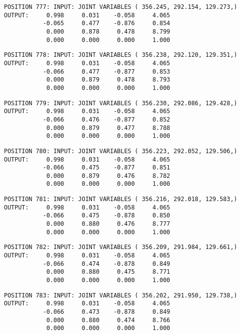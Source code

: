 \begin{verbatim}
POSITION 777: INPUT: JOINT VARIABLES ( 356.245, 292.154, 129.273,)
OUTPUT:     0.998     0.031    -0.058     4.065
           -0.065     0.477    -0.876     0.854
            0.000     0.878     0.478     8.799
            0.000     0.000     0.000     1.000
\end{verbatim} \pagebreak[1]\begin{verbatim}
POSITION 778: INPUT: JOINT VARIABLES ( 356.238, 292.120, 129.351,)
OUTPUT:     0.998     0.031    -0.058     4.065
           -0.066     0.477    -0.877     0.853
            0.000     0.879     0.478     8.793
            0.000     0.000     0.000     1.000
\end{verbatim} \pagebreak[1]\begin{verbatim}
POSITION 779: INPUT: JOINT VARIABLES ( 356.230, 292.086, 129.428,)
OUTPUT:     0.998     0.031    -0.058     4.065
           -0.066     0.476    -0.877     0.852
            0.000     0.879     0.477     8.788
            0.000     0.000     0.000     1.000
\end{verbatim} \pagebreak[1]\begin{verbatim}
POSITION 780: INPUT: JOINT VARIABLES ( 356.223, 292.052, 129.506,)
OUTPUT:     0.998     0.031    -0.058     4.065
           -0.066     0.475    -0.877     0.851
            0.000     0.879     0.476     8.782
            0.000     0.000     0.000     1.000
\end{verbatim} \pagebreak[1]\begin{verbatim}
POSITION 781: INPUT: JOINT VARIABLES ( 356.216, 292.018, 129.583,)
OUTPUT:     0.998     0.031    -0.058     4.065
           -0.066     0.475    -0.878     0.850
            0.000     0.880     0.476     8.777
            0.000     0.000     0.000     1.000
\end{verbatim} \pagebreak[1]\begin{verbatim}
POSITION 782: INPUT: JOINT VARIABLES ( 356.209, 291.984, 129.661,)
OUTPUT:     0.998     0.031    -0.058     4.065
           -0.066     0.474    -0.878     0.849
            0.000     0.880     0.475     8.771
            0.000     0.000     0.000     1.000
\end{verbatim} \pagebreak[1]\begin{verbatim}
POSITION 783: INPUT: JOINT VARIABLES ( 356.202, 291.950, 129.738,)
OUTPUT:     0.998     0.031    -0.058     4.065
           -0.066     0.473    -0.878     0.849
            0.000     0.880     0.474     8.766
            0.000     0.000     0.000     1.000
\end{verbatim} \pagebreak[1]\begin{verbatim}

\end{verbatim}
